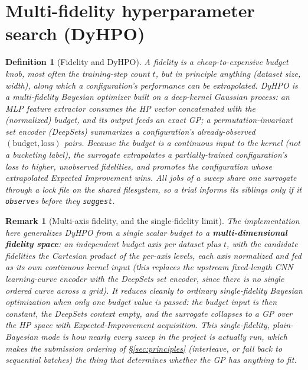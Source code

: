\documentclass[11pt]{article}
\newcommand{\code}[1]{\texttt{#1}}
\newtheorem{definition}{Definition}
\newtheorem{remark}{Remark}
\begin{document}
\section{Multi-fidelity hyperparameter search (DyHPO)}\label{sec:dyhpo}

\begin{definition}[Fidelity and DyHPO]\label{def:dyhpo}
A \emph{fidelity} is a cheap-to-expensive budget knob, most often the training-step count
$t$, but in principle anything (dataset size, width), along which a configuration's
performance can be extrapolated. DyHPO is a multi-fidelity Bayesian optimizer built on a
\emph{deep-kernel} Gaussian process: an MLP feature extractor consumes the HP vector
\emph{concatenated with the (normalized) budget}, and its output feeds an exact GP; a
permutation-invariant set encoder (DeepSets) summarizes a configuration's already-observed
$(\text{budget},\text{loss})$ pairs. Because the budget is a continuous \emph{input} to the
kernel (not a bucketing label), the surrogate \emph{extrapolates} a partially-trained
configuration's loss to higher, unobserved fidelities, and promotes the configuration whose
extrapolated Expected Improvement wins. All jobs of a sweep share one surrogate through a lock
file on the shared filesystem, so a trial informs its siblings only if it \code{observe}s
before they \code{suggest}.
\end{definition}

\begin{remark}[Multi-axis fidelity, and the single-fidelity limit]\label{rem:dyhpo}
The implementation here generalizes DyHPO from a single scalar budget to a
\textbf{multi-dimensional fidelity space}: an independent budget axis per dataset plus $t$, with
the candidate fidelities the Cartesian product of the per-axis levels, each axis normalized and
fed as its own continuous kernel input (this replaces the upstream fixed-length CNN
learning-curve encoder with the DeepSets set encoder, since there is no single ordered curve
across a grid). It reduces cleanly to ordinary single-fidelity Bayesian optimization when only
one budget value is passed: the budget input is then constant, the DeepSets context empty, and
the surrogate collapses to a GP over the HP space with Expected-Improvement acquisition. This
single-fidelity, plain-Bayesian mode is how nearly every sweep in the project is actually run,
which makes the submission ordering of \S\ref{sec:principles} (interleave, or fall back to
sequential batches) the thing that determines whether the GP has anything to fit.
\end{remark}
\end{document}
